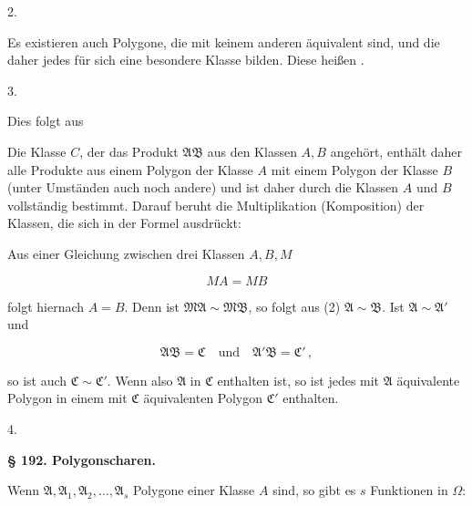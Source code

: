 2. 

Es existieren auch Polygone, die mit keinem anderen äquivalent sind, und die daher jedes für sich eine besondere Klasse bilden. Diese heißen .

3. 

Dies folgt aus


Die Klasse $C$, der das Produkt $\mathfrak{A}\mathfrak{B}$ aus den Klassen $A, B$ angehört, enthält daher alle Produkte aus einem Polygon der Klasse $A$ mit einem Polygon der Klasse $B$ (unter Umständen auch noch andere) und ist daher durch die Klassen $A$ und $B$ vollständig bestimmt. Darauf beruht die Multiplikation (Komposition) der Klassen, die sich in der Formel ausdrückt:


Aus einer Gleichung zwischen drei Klassen $A, B, M$

\[
MA = MB
\]

folgt hiernach $A = B$. Denn ist $\mathfrak{M}\mathfrak{A} \sim \mathfrak{M}\mathfrak{B}$, so folgt aus (2) $\mathfrak{A} \sim \mathfrak{B}$. Ist $\mathfrak{A} \sim \mathfrak{A}'$ und

\[
\mathfrak{A}\mathfrak{B} = \mathfrak{C} \quad \text{und} \quad \mathfrak{A}'\mathfrak{B} = \mathfrak{C}'\,,
\]

so ist auch $\mathfrak{C} \sim \mathfrak{C}'$. Wenn also $\mathfrak{A}$ in $\mathfrak{C}$ enthalten ist, so ist jedes mit $\mathfrak{A}$ äquivalente Polygon in einem mit $\mathfrak{C}$ äquivalenten Polygon $\mathfrak{C}'$ enthalten.

4. 



\begin{center}
\textbf{§ 192. Polygonscharen.}
\end{center}

Wenn $\mathfrak{A}, \mathfrak{A}_1, \mathfrak{A}_2, \ldots, \mathfrak{A}_s$ Polygone einer Klasse $A$ sind, so gibt es $s$ Funktionen in $\Omega$:

